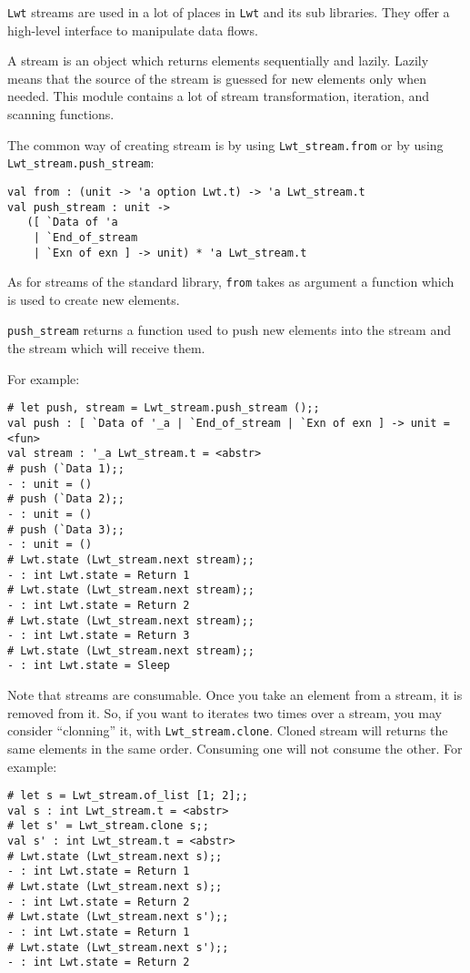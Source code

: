 \documentclass{article}
\newcommand{\lwt}{\texttt{Lwt}\xspace}
\begin{document}
\lwt streams are used in a lot of places in \lwt and its sub
libraries. They offer a high-level interface to manipulate data flows.

A stream is an object which returns elements sequentially and
lazily. Lazily means that the source of the stream is guessed for new
elements only when needed. This module contains a lot of stream
transformation, iteration, and scanning functions.

The common way of creating stream is by using
\texttt{Lwt\_stream.from} or by using
\texttt{Lwt\_stream.push\_stream}:

\begin{verbatim}
val from : (unit -> 'a option Lwt.t) -> 'a Lwt_stream.t
val push_stream : unit ->
   ([ `Data of 'a
    | `End_of_stream
    | `Exn of exn ] -> unit) * 'a Lwt_stream.t
\end{verbatim}

As for streams of the standard library, \texttt{from} takes as
argument a function which is used to create new elements.

\texttt{push\_stream} returns a function used to push new elements
into the stream and the stream which will receive them.

For example:

\begin{verbatim}
# let push, stream = Lwt_stream.push_stream ();;
val push : [ `Data of '_a | `End_of_stream | `Exn of exn ] -> unit = <fun>
val stream : '_a Lwt_stream.t = <abstr>
# push (`Data 1);;
- : unit = ()
# push (`Data 2);;
- : unit = ()
# push (`Data 3);;
- : unit = ()
# Lwt.state (Lwt_stream.next stream);;
- : int Lwt.state = Return 1
# Lwt.state (Lwt_stream.next stream);;
- : int Lwt.state = Return 2
# Lwt.state (Lwt_stream.next stream);;
- : int Lwt.state = Return 3
# Lwt.state (Lwt_stream.next stream);;
- : int Lwt.state = Sleep
\end{verbatim}

Note that streams are consumable. Once you take an element from a
stream, it is removed from it. So, if you want to iterates two times
over a stream, you may consider ``clonning'' it, with
\texttt{Lwt\_stream.clone}. Cloned stream will returns the same
elements in the same order. Consuming one will not consume the other.
For example:

\begin{verbatim}
# let s = Lwt_stream.of_list [1; 2];;
val s : int Lwt_stream.t = <abstr>
# let s' = Lwt_stream.clone s;;
val s' : int Lwt_stream.t = <abstr>
# Lwt.state (Lwt_stream.next s);;
- : int Lwt.state = Return 1
# Lwt.state (Lwt_stream.next s);;
- : int Lwt.state = Return 2
# Lwt.state (Lwt_stream.next s');;
- : int Lwt.state = Return 1
# Lwt.state (Lwt_stream.next s');;
- : int Lwt.state = Return 2
\end{verbatim}
\end{document}
